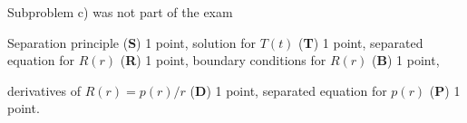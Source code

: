 \begin{diskussion}
Subproblem c) was not part of the exam
\end{diskussion}

\begin{bewertung}
\begin{teilaufgaben}
\item
Separation principle ({\bf S}) 1 point,
solution for $T(t)$ ({\bf T}) 1 point,
separated equation for $R(r)$ ({\bf R}) 1 point,
boundary conditions for $R(r)$  ({\bf B}) 1 point,
\item
derivatives of $R(r)=p(r)/r$ ({\bf D}) 1 point,
separated equation for $p(r)$ ({\bf P}) 1 point.
\end{teilaufgaben}
\end{bewertung}




